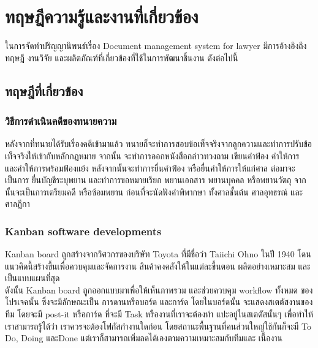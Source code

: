 \documentclass[12pt,oneside,openright,a4paper]{cpe-thai-project}
\begin{document}
\chapter{ทฤษฎีความรู้และงานที่เกี่ยวข้อง}

\hspace*{1cm}ในการจัดทําปริญญานิพนธ์เรื่อง Document management system for lawyer มีการอ้างอิงถึงทฤษฎี งานวิจัย และผลิตภัณฑ์ที่เกี่ยวข้องที่ใช้ในการพัฒนาชิ้นงาน ดังต่อไปนี้

\section{ทฤษฎีที่เกี่ยวข้อง}

\subsection{วิธีการดำเนินคดีของทนายความ} 
\hspace*{1cm}หลังจากที่ทนายได้รับเรื่องคดีเข้ามาแล้ว ทนายก็จะทำการสอบข้อเท็จจริงจากลูกความและทำการปรับข้อเท็จจริงให้เข้ากับหลักกฎหมาย จากนั้น จะทำการออกหนังสือกล่าวทวงถาม เขียนคำฟ้อง คำให้การ และคำให้การพร้อมฟ้องแย้ง หลังจากนั้นจะทำการยื่นคำฟ้อง หรือยื่นคำให้การให้แก่ศาล ต่อมาจะเป็นการ ยื่นบัญชีระบุพยาน และทำการขอหมายเรียก พยานเอกสาร พยานบุคคล หรือพยานวัตถุ จากนั้นจะเป็นการเตรียมคดี หรือซ้อมพยาน ก่อนที่จะนัดฟังคำพิพากษา ทั้งศาลชั้นต้น ศาลอุทธรณ์ และศาลฎีกา 

\subsection{Kanban software developments} 
\hspace*{1cm}Kanban board ถูกสร้างจากวิศวกรของบริษัท Toyota ที่มีชื่อว่า Taiichi Ohno ในปี 1940 โดนแนวคิดนี้สร้างขึ้นเพื่อควบคุมและจัดการงาน สินค้าคงคลังให้ในแต่ละขึ้นตอน ผลิตอย่างเหมาะสม และเป็นแบบแผนที่สุด\\
\hspace*{1cm}ดังนั้น Kanban board ถูกออกแบบมาเพื่อให้เห็นภาพรวม และช่วยควบคุม workflow ทั้งหมด ของโปรเจคนั้น ซึ่งจะมีลักษณะเป็น การดานหรือบอร์ด และการ์ด โดยในบอร์ดนั้น จะแสดงสเตตัสงานของทีม โดยจะมี post-it หรือการ์ด ที่จะมี Task หรืองานที่เราจะต้องทำ แปะอยู่ในสเตตัสนั้นๆ เพื่อทำให้เราสามารถรู้ได้ว่า เราควรจะต้องโฟกัสกำงานใดก่อน โดยสถานะพื้นฐานที่คนส่วนใหญ่ใช้กันก็จะมี To Do, Doing และDone แต่เราก็สามารถเพิ่มลดได้เองตามความเหมาะสมกับทีมและ เนื้องาน
\end{document}
